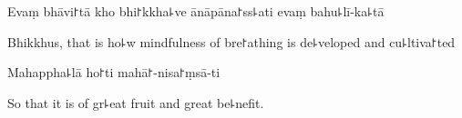 Evaṃ bhāvi꜓tā kho bhi꜓kkha꜕ve ānāpāna꜓ss꜕ati evaṃ bahu꜕lī-ka꜕tā

\begin{english}
  Bhikkhus, that is ho꜕w mindfulness of bre꜓athing is de꜕veloped and cu꜕ltiva꜓ted
\end{english}

Mahappha꜕lā ho꜓ti mahā꜓-nisa꜓ṃsā-ti

\begin{english}
  So that it is of gr꜕eat fruit and great be꜕nefit.
\end{english}


